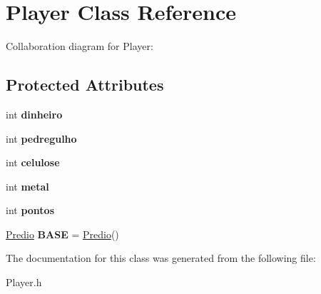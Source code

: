 \hypertarget{classPlayer}{}\section{Player Class Reference}
\label{classPlayer}


Collaboration diagram for Player\+:
\subsection*{Protected Attributes}
\begin{DoxyCompactItemize}
\item 
int {\bfseries dinheiro}\hypertarget{classPlayer_a86262b96fbb7760c9139081ecf09170c}{}\label{classPlayer_a86262b96fbb7760c9139081ecf09170c}

\item 
int {\bfseries pedregulho}\hypertarget{classPlayer_a567af933fc0b98641abb7cc1e79645f3}{}\label{classPlayer_a567af933fc0b98641abb7cc1e79645f3}

\item 
int {\bfseries celulose}\hypertarget{classPlayer_a72bf222bce74296e67663b484b979927}{}\label{classPlayer_a72bf222bce74296e67663b484b979927}

\item 
int {\bfseries metal}\hypertarget{classPlayer_a9f0f43f60ecd36c2bea491608390cc47}{}\label{classPlayer_a9f0f43f60ecd36c2bea491608390cc47}

\item 
int {\bfseries pontos}\hypertarget{classPlayer_abf9a330cc01f3de9049c78315b9ed7cf}{}\label{classPlayer_abf9a330cc01f3de9049c78315b9ed7cf}

\item 
\hyperlink{classPredio}{Predio} {\bfseries B\+A\+SE} = \hyperlink{classPredio}{Predio}()\hypertarget{classPlayer_a18231690d604c62d627fc54ca7d7ce43}{}\label{classPlayer_a18231690d604c62d627fc54ca7d7ce43}

\end{DoxyCompactItemize}


The documentation for this class was generated from the following file\+:\begin{DoxyCompactItemize}
\item 
Player.\+h\end{DoxyCompactItemize}

